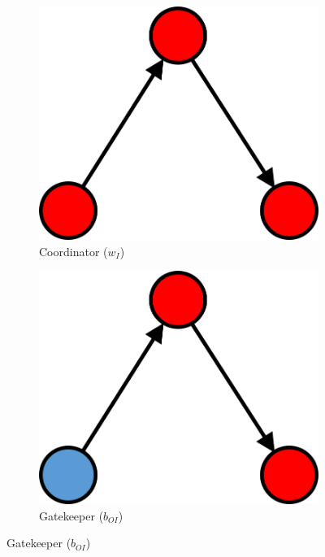 \begin{figure}
\centering
  \begin{subfigure}[b]{0.25\textwidth}
    \includegraphics[width=\textwidth]{Images/w_I.png}
    \caption{Coordinator ($w_I$)}
    \label{fig:1}
  \end{subfigure}
  \hspace{2em}
  \begin{subfigure}[b]{0.25\textwidth}
    \includegraphics[width=\textwidth]{Images/b_OI.png}
    \caption{Gatekeeper ($b_{OI}$)}
    \label{fig:2}

\end{subfigure}
\end{figure}
